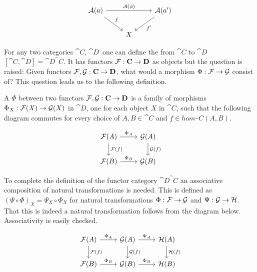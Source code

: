 \documentclass[../../main.tex]{subfiles}
\begin{document}
    \begin{figure}[H]
        \[
            \begin{tikzcd}
                \functor{A}(a) \arrow{dr}{f} \arrow{rr}{\functor{A}(\phi)} && \functor{A}(a') \arrow{dl}{f'}\\
                & X
            \end{tikzcd}
        \]
    \end{figure}

    For any two categories $\cat{C}$, $\cat{D}$ one can define the  from $\cat{C}$ to $\cat{D}$ $[\cat{C}, \cat{D}] = \cat{D}^\cat{C}$. It has functors $\mathcal{F}: \mathbf{C} \to \mathbf{D}$ as objects but the question is raised: Given functors $\mathcal{F}, \mathcal{G}: \mathbf{C} \to \mathbf{D}$, what would a morphism $\Phi: \mathcal{F} \to \mathcal{G}$ consist of? This question leads us to the following definition.

    \begin{definition}
        A  $\Phi$ between two functors $\mathcal{F}, \mathcal{G}: \mathbf{C} \to \mathbf{D}$ is a family of morphisms $\Phi_X: \mathcal{F}(X) \to \mathcal{G}(X)$ in $\cat{D}$, one for each object $X$ in $\cat{C}$, such that the following diagram commutes for every choice of $A, B \in \cat{C}$ and $f \in hom_\cat{C}(A, B)$. 
    \end{definition}

    \begin{figure}[H]
        \[
            \begin{tikzcd}
                \functor{F}(A) \arrow[r, "\Phi_A"] \arrow[d, "\functor{F}(f)"]
                & \functor{G}(A) \arrow[d, "\functor{G}(f)"]\\
                \functor{F}(B) \arrow[r, "\Phi_B"]
                & \functor{G}(B)
            \end{tikzcd}
        \]
    \end{figure}

    To complete the definition of the functor category $\cat{D}^\cat{C}$ an associative composition of natural transformations is needed. This is defined as $(\Psi \circ \Phi)_X = \Psi_X \circ \Phi_X$ for natural transformations $\Phi: \mathcal{F} \to \mathcal{G}$ and $\Psi: \mathcal{G} \to \mathcal{H}$. That this is indeed a natural transformation follows from the diagram below. Associativity is easily checked.

    \begin{figure}[H]
        \[
            \begin{tikzcd}
                \functor{F}(A) \arrow[r, "\Phi_A"] \arrow[d, "\functor{F}(f)"]
                & \functor{G}(A) \arrow[r, "\Psi_A"] \arrow[d, "\functor{G}(f)"]
                & \functor{H}(A) \arrow[d, "\functor{H}(f)"]\\
                \functor{F}(B) \arrow[r, "\Phi_B"]
                & \functor{G}(B) \arrow[r, "\Phi_B"]
                & \functor{H}(B)
            \end{tikzcd}
        \]
    \end{figure}
\end{document}
